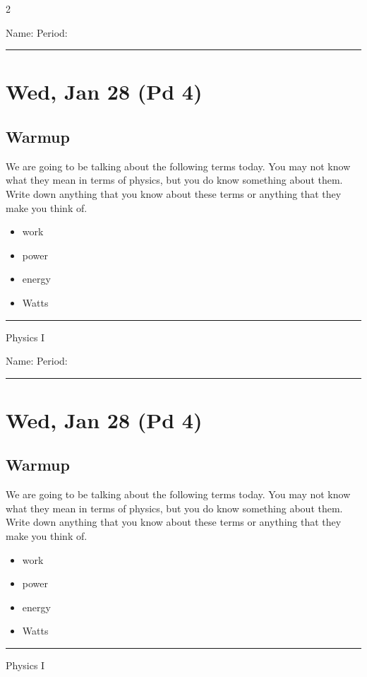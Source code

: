 \documentclass[10pt,landscape]{exam}
\def\todayDate{Wed, Jan 28 (Pd 4)}
\def\content{
We are going to be talking about the following terms today.  You may not know what they mean in terms of physics, but you do know something about them.  Write down anything that you know about these terms or anything that they make you think of.

\begin{itemize}
  \item work
  \item power
  \item energy
  \item Watts
\end{itemize}
}
\begin{document}
\pagestyle{empty}

\setlength{\columnsep}{0.8in}
\begin{multicols*}{2}

\noindent  
Name: \hfill Period: \hspace{5em}
\vspace{0.5em}
\hrule

\section*{\todayDate}
\subsection*{Warmup}

\content

\vfill
\hrule
\vspace{0.5em}
\hfill {\sc Physics I}

\columnbreak

\noindent  
Name: \hfill Period: \hspace{5em}
\vspace{0.5em}
\hrule

\section*{\todayDate}
\subsection*{Warmup}

\content

\vfill
\hrule
\vspace{0.5em}
\hfill {\sc Physics I}

\end{multicols*}
\end{document}
